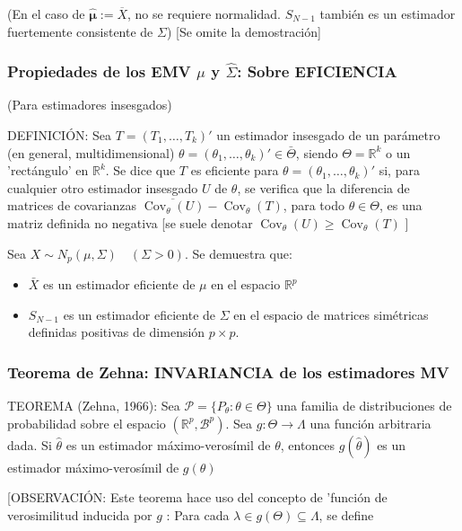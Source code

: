 \documentclass[11pt,a4paper]{article}
\begin{document}
(En el caso de $\hat{\boldsymbol{\mu}}:=\overline{X}$, no se requiere normalidad. $S_{N-1}$ también es un estimador fuertemente consistente de $\Sigma$) [Se omite la demostración]

\subsubsection{Propiedades de los EMV \texorpdfstring{$\hat{\mu}$}) y \texorpdfstring{$\hat{\Sigma}$}): Sobre EFICIENCIA}
(Para estimadores insesgados)

DEFINICIÓN: Sea $T=(T_{1}, \ldots, T_{k})'$ un estimador insesgado de un parámetro (en general, multidimensional) $\theta=(\theta_{1}, \ldots, \theta_{k})' \in \bar{\Theta}$, siendo $\Theta=\mathbb{R}^{k}$ o un 'rectángulo' en $\mathbb{R}^{k}$. Se dice que $T$ es eficiente para $\theta=(\theta_{1}, \ldots, \theta_{k})'$ si, para cualquier otro estimador insesgado $U$ de $\theta$, se verifica que la diferencia de matrices de covarianzas $\overline{\operatorname{Cov}_{\theta}(U)}-\operatorname{Cov}_{\theta}(T)$, para todo $\theta \in \Theta$, es una matriz definida no negativa [se suele denotar $\operatorname{Cov}_{\theta}(U) \geq \operatorname{Cov}_{\theta}(T)$ ]

Sea $X \sim N_{p}(\mu, \Sigma) \quad(\Sigma>0)$. Se demuestra que:
\begin{itemize}
\item $\bar{X}$ es un estimador eficiente de $\mu$ en el espacio $\mathbb{R}^{p}$
\item $S_{N-1}$ es un estimador eficiente de $\Sigma$ en el espacio de matrices simétricas definidas positivas de dimensión $p \times p$.
\end{itemize}

\subsubsection{Teorema de Zehna: INVARIANCIA de los estimadores MV}
TEOREMA (Zehna, 1966): Sea $\mathcal{P}=\{P_{\theta}: \theta \in \Theta\}$ una familia de distribuciones de probabilidad sobre el espacio $(\mathbb{R}^{p}, \mathcal{B}^{p})$. Sea $g: \Theta \rightarrow \Lambda$ una función arbitraria dada. Si $\hat{\theta}$ es un estimador máximo-verosímil de $\theta$, entonces $g(\hat{\theta})$ es un estimador máximo-verosímil de $g(\theta)$

[OBSERVACIÓN: Este teorema hace uso del concepto de 'función de verosimilitud inducida por $g$ : Para cada $\lambda \in g(\Theta) \subseteq \Lambda$, se define
\end{document}
